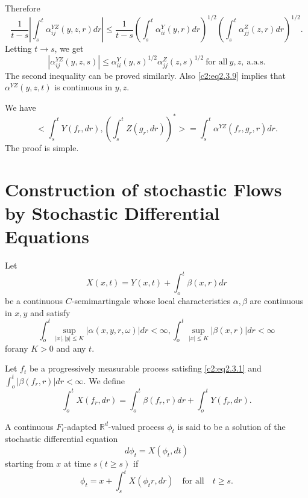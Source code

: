 \noindent Therefore 
  $$
  \frac{1}{t-s}|\int^t_s \alpha^{YZ}_{ij}(y,z,r)dr| \leq
  \frac{1}{t-s} \left(\int^t_s \alpha^Y_{ii}(y,r)dr\right)^{1/2}\left(\int^t_s
  \alpha^Z_{jj}(z,r)dr\right)^{1/2}.  
  $$
  Letting $t \to s$, we get
  $$
  |\alpha^{YZ}_{ij}(y,z,s)|\leq
  \alpha^Y_{ii}(y,s)^{1/2}\alpha^Z_{jj}(z,s)^{1/2} ~\text{for
    all}~ y, z, ~\text{a.a.s.} 
  $$
  The second inequality can be proved similarly. Also \eqref{c2:eq2.3.9}
  implies that $\alpha^{YZ}(y,z,t)$ is continuous in $y,z$. 
 
\setcounter{theorem}{3}
\begin{theorem}\label{c2:thm2.3.4}%
   We have
   \begin{equation*}
     < \int^t_sY(f_r,dr),\left(\int^t_s Z(g_r,dr)\right)^*>=\int^t_s
     \alpha^{YZ}(f_r,g_r,r)dr. \tag{2.3.11}\label{c2:eq2.3.11} 
   \end{equation*}
   The proof is simple.
\end{theorem}   

\section[Construction of stochastic......]{Construction of stochastic Flows by Stochastic Differential
   Equations}\label{chap2:sec2.4}%
 
 Let
\begin{equation*}
  X(x,t)=Y(x,t)+ \int^t_o \beta(x,r)dr \tag{2.4.1}\label{c2:eq2.4.1}
\end{equation*}
be a continuous $C$-semimartingale whose local characteristics
$\alpha, \beta$ are continuous in $x,y$ and satisfy 
\begin{equation*}
  \int^t_o \sup_{|x|,|y|\leq K} |\alpha (x,y,r,\omega)|dr < \infty,
  \int^t_o \sup_{|x|\leq K}|\beta(x,r)|dr < \infty\tag*{$(A4)'$} 
\end{equation*} 
for\pageoriginale any $K > 0$ and any $t$.


Let $f_t$ be a progressively measurable process satisfing \eqref{c2:eq2.3.1}
and $\int^t_o | \beta(f_r,r)|dr<\infty$. We define 
\begin{equation*}
  \int^t_o X(f_r,dr)=\int^t_o \beta(f_r,r)dr+
\int^t_o Y(f_r,dr). \tag{2.4.2}\label{c2:eq2.4.2}
\end{equation*}


\begin{definition}\label{c2:def2.4.1}%
  A continuous $F_t$-adapted $\mathbb{R}^d$-valued process $\phi_t$ is
  said to be a solution of the stochastic differential equation 
  \begin{equation*}
    d\phi_t =X(\phi_t,dt) \tag{2.4.3}\label{c2:eq2.4.3}
  \end{equation*}
  starting from $x$ at time $s(t \geq s)$ if 
  \begin{equation*}
    \phi_t =x+\int^t_s X(\phi_tr,dr) \quad \text{for all} \quad t \geq
    s. \tag{2.4.4}\label{c2:eq2.4.4} 
  \end{equation*}
\end{definition}

